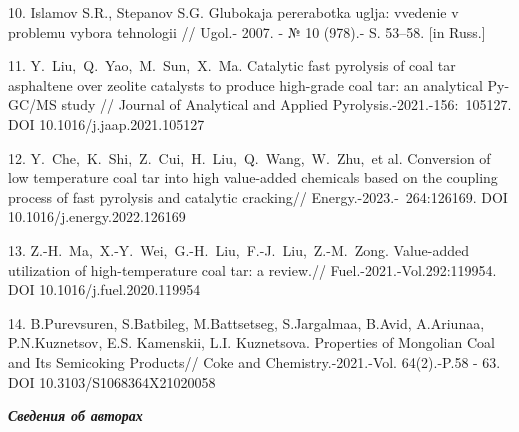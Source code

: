 \begin{noparindent}
10. Islamov S.R., Stepanov S.G. Glubokaja pererabotka uglja: vvedenie v
problemu vybora tehnologii // Ugol\textquotesingle.- 2007. - № 10
(978).- S. 53--58. {[}in Russ.{]}

11. Y.~Liu,~Q.~Yao,~M.~Sun,~X.~Ma. Catalytic fast pyrolysis of coal tar
asphaltene over zeolite catalysts to produce high-grade coal tar: an
analytical Py-GC/MS study // Journal of Analytical and Applied
Pyrolysis.-2021.-156:~105127. DOI 10.1016/j.jaap.2021.105127

12. Y.~Che,~K.~Shi,~Z.~Cui,~H.~Liu,~Q.~Wang,~W.~Zhu,~et al. Conversion
of low temperature coal tar into high value-added chemicals based on the
coupling process of fast pyrolysis and catalytic cracking//
Energy.-2023.-~264:126169. DOI 10.1016/j.energy.2022.126169

13. Z.-H.~Ma,~X.-Y.~Wei,~G.-H.~Liu,~F.-J.~Liu,~Z.-M.~Zong. Value-added
utilization of high-temperature coal tar: a review.//
Fuel.-2021.-Vol.292:119954. DOI 10.1016/j.fuel.2020.119954

14. B.Purevsuren, S.Batbileg, M.Battsetseg, S.Jargalmaa, B.Avid,
A.Ariunaa, P.N.Kuznetsov, E.S. Kamenskii, L.I. Kuznetsova. Properties of
Mongolian Coal and Its Semicoking Products// Coke and
Chemistry.-2021.-Vol. 64(2).-P.58 - 63. DOI 10.3103/S1068364X21020058
\end{noparindent}

\emph{{\bfseries Сведения об авторах}}

